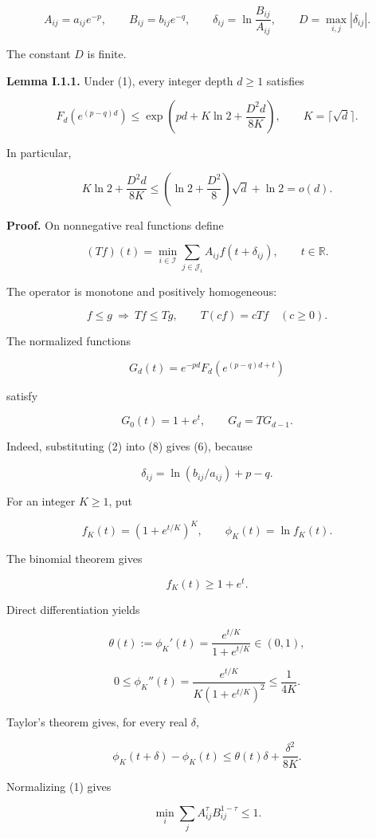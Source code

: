 \[
A_{ij}=a_{ij}e^{-p},\qquad B_{ij}=b_{ij}e^{-q},\qquad
\delta_{ij}=\ln\frac{B_{ij}}{A_{ij}},\qquad
D=\max_{i,j}|\delta_{ij}|.
\tag{3}
\]

The constant \(D\) is finite.

\textbf{Lemma I.1.1.} Under (1), every integer depth \(d\geq1\) satisfies

\[
F_d\!\left(e^{(p-q)d}\right)
\leq
\exp\left(pd+K\ln2+\frac{D^2d}{8K}\right),
\qquad K=\lceil\sqrt d\rceil.
\tag{4}
\]

In particular,

\[
K\ln2+\frac{D^2d}{8K}
\leq
\left(\ln2+\frac{D^2}{8}\right)\sqrt d+\ln2
=o(d).
\tag{5}
\]

\textbf{Proof.} On nonnegative real functions define

\[
(Tf)(t)=
\min_{i\in\mathcal I}\sum_{j\in\mathcal J_i}
A_{ij}f(t+\delta_{ij}),\qquad t\in\mathbb R.
\tag{6}
\]

The operator is monotone and positively homogeneous:

\[
f\leq g\ \Longrightarrow\ Tf\leq Tg,
\qquad T(cf)=cTf\quad(c\geq0).
\tag{7}
\]

The normalized functions

\[
G_d(t)=e^{-pd}F_d\!\left(e^{(p-q)d+t}\right)
\tag{8}
\]

satisfy

\[
G_0(t)=1+e^t,\qquad G_d=TG_{d-1}.
\tag{9}
\]

Indeed, substituting (2) into (8) gives (6), because

\[
\delta_{ij}=\ln(b_{ij}/a_{ij})+p-q.
\]

For an integer \(K\geq1\), put

\[
f_K(t)=\left(1+e^{t/K}\right)^K,
\qquad \phi_K(t)=\ln f_K(t).
\tag{10}
\]

The binomial theorem gives

\[
f_K(t)\geq1+e^t.
\tag{11}
\]

Direct differentiation yields

\[
\theta(t):=\phi_K'(t)
=\frac{e^{t/K}}{1+e^{t/K}}\in(0,1),
\]

\[
0\leq\phi_K''(t)
=\frac{e^{t/K}}{K(1+e^{t/K})^2}
\leq\frac1{4K}.
\tag{12}
\]

Taylor's theorem gives, for every real \(\delta\),

\[
\phi_K(t+\delta)-\phi_K(t)
\leq\theta(t)\delta+\frac{\delta^2}{8K}.
\tag{13}
\]

Normalizing (1) gives

\[
\min_i\sum_j A_{ij}^{\tau}B_{ij}^{1-\tau}\leq1.
\tag{14}
\]

